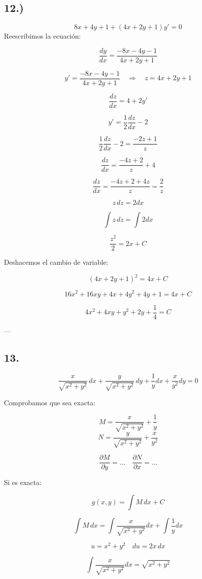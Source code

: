 \documentclass[a4paper,12pt]{article}
\begin{document}
\subsection*{12.)}
\[
8x + 4y + 1 + (4x + 2y + 1)y' = 0
\]
Reescribimos la ecuación:

\[
\frac{dy}{dx} = \frac{-8x - 4y - 1}{4x + 2y + 1}
\]

\[
y' = \frac{-8x - 4y - 1}{4x + 2y + 1} \quad \Rightarrow \quad z = 4x + 2y + 1
\]

\[
\frac{dz}{dx} = 4 + 2y'
\]

\[
y' = \frac{1}{2} \frac{dz}{dx} - 2
\]

\[
\frac{1}{2}\frac{dz}{dx} - 2 = \frac{-2z + 1}{z}
\]

\[
\frac{dz}{dx} = \frac{-4z + 2}{z} + 4
\]

\[
\frac{dz}{dx} = \frac{-4z + 2 + 4z}{z} = \frac{2}{z}
\]

\[
z\, dz = 2 dx
\]

\[
\int z\, dz = \int 2 dx
\]

\[
\frac{z^2}{2} = 2x + C
\]

Deshacemos el cambio de variable:

\[
(4x + 2y + 1)^2 = 4x + C
\]

\[
16x^2 + 16xy + 4x + 4y^2 + 4y + 1 = 4x + C
\]

\[
4x^2 + 4xy + y^2 + 2y + \frac{1}{4} = C
\]

---

\subsection*{13.}
\[
\frac{x}{\sqrt{x^2 + y^2}}\, dx + \frac{y}{\sqrt{x^2 + y^2}}\, dy + \frac{1}{y} dx + \frac{x}{y^2} dy = 0
\]

Comprobamos que sea exacta:

\[
M = \frac{x}{\sqrt{x^2 + y^2}} + \frac{1}{y}
\]
\[
N = \frac{y}{\sqrt{x^2 + y^2}} + \frac{x}{y^2}
\]

\[
\frac{\partial M}{\partial y} = \dots \quad \frac{\partial N}{\partial x} = \dots
\]

Si es exacta:

\[
g(x,y) = \int M\, dx + C
\]

\[
\int M\, dx = \int \frac{x}{\sqrt{x^2 + y^2}} dx + \int \frac{1}{y} dx
\]

\[
u = x^2 + y^2 \quad du = 2x\, dx
\]

\[
\int \frac{x}{\sqrt{x^2 + y^2}} dx = \sqrt{x^2 + y^2}
\]
\end{document}
